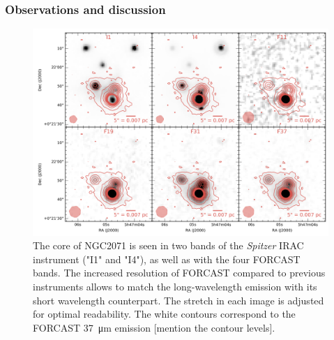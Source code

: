 \subsubsection{Observations and discussion}

\begin{landscape}
\begin{figure}
\begin{center}
\includegraphics[width=1.4\textwidth]{Figures/NGC2071_mosaic.png}


\caption{The core of NGC2071 is seen in two bands of the \textit{Spitzer} IRAC instrument ("I1" and "I4"), as well as with the four FORCAST bands. The increased resolution of FORCAST compared to previous instruments allows to match the long-wavelength emission with its short wavelength counterpart. The stretch in each image is adjusted for optimal readability. The white contours correspond to the FORCAST \SI{37}{\micro\meter} emission [mention the contour levels]. }
\label{fig:NGC2071_mosaic}
\end{center}
\end{figure}
\end{landscape}


